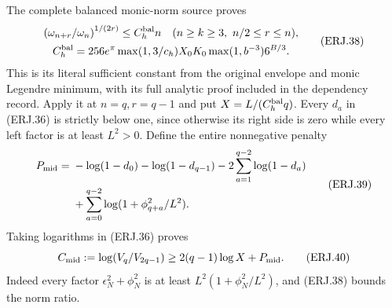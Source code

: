 The complete balanced monic-norm source proves
\[
 \begin{gathered}
 \left(\omega_{n+r}/\omega_n\right)^{1/(2r)}
 \le C_h^{\rm bal}n\quad(n\ge k\ge3,\ n/2\le r\le n),
 \\
 C_h^{\rm bal}=256e^\pi\max(1,3/c_h)X_0K_0
                       \max(1,b^{-3})6^{B/3}.
 \end{gathered}
 \tag{ERJ.38}
\]
This is its literal sufficient constant from the original envelope and
monic Legendre minimum, with its full analytic proof included in the
dependency record. Apply it at $n=q,r=q-1$ and put
$X=L/(C_h^{\rm bal}q)$. Every $d_a$ in (ERJ.36) is strictly
below one, since otherwise its right side is zero while every left
factor is at least $L^2>0$. Define the entire nonnegative penalty
\[
\begin{split}
 P_{\rm mid}={}&-\log(1-d_0)-\log(1-d_{q-1})
 -2\sum_{a=1}^{q-2}\log(1-d_a)\\
 &+\sum_{a=0}^{q-2}\log(1+\phi_{q+a}^2/L^2).
\end{split}\tag{ERJ.39}
\]
Taking logarithms in (ERJ.36) proves
\[
 C_{\rm mid}:=\log(V_q/V_{2q-1})
       \ge2(q-1)\log X+P_{\rm mid}.\tag{ERJ.40}
\]
Indeed every factor $\epsilon_N^2+\phi_N^2$ is at least
$L^2(1+\phi_N^2/L^2)$, and (ERJ.38) bounds the norm ratio.

